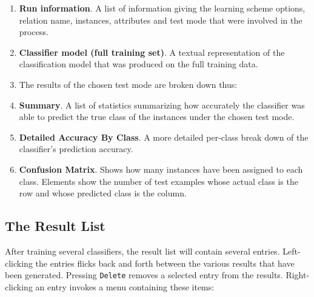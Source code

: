 \documentclass[a4paper]{article}
\begin{document}
\begin{enumerate}
\item \textbf{Run information}.
A list of information giving the learning scheme options, relation name,
instances, attributes and test mode that were involved in the process.
\item \textbf{Classifier model (full training set)}.
A textual representation of the classification model that was produced on the
full training data. 
\item The results of the chosen test mode are broken down thus:
\item \textbf{Summary}.
A list of statistics summarizing how accurately the classifier was able to
predict the true class of the instances under the chosen test mode. 
\item \textbf{Detailed Accuracy By Class}.
A more detailed per-class break down of the classifier's prediction accuracy. 
\item \textbf{Confusion Matrix}.
Shows how many instances have been assigned to each class. Elements show the
number of test examples whose actual class is the row and whose predicted class
is the column.
\end{enumerate}

\subsection{The Result List}

After training several classifiers, the result list will contain several
entries.  Left-clicking the entries flicks back and forth between the various
results that have been generated. Pressing \texttt{Delete} removes a selected 
entry from the results. Right-clicking an entry invokes a menu containing these items:
\end{document}
